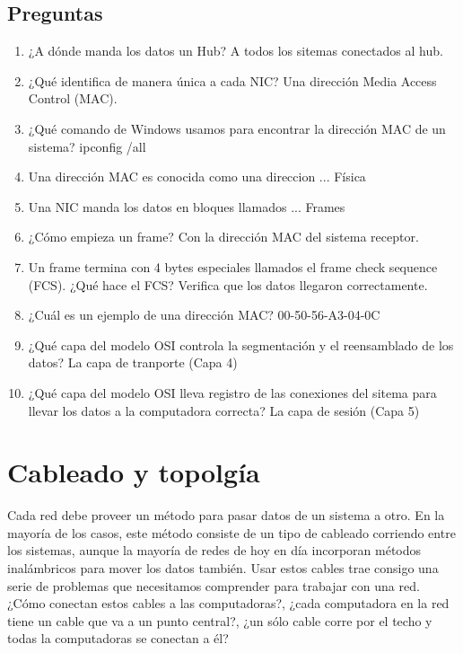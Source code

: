 \documentclass[12pt]{report}
\begin{document}
\section{Preguntas}

\begin{enumerate}
  \item ¿A dónde manda los datos un Hub?
    A todos los sitemas conectados al hub.
  \item ¿Qué identifica de manera única a cada NIC?
    Una dirección Media Access Control (MAC).
  \item ¿Qué comando de Windows usamos para encontrar la dirección MAC de un sistema?
    ipconfig /all
  \item Una dirección MAC es conocida como una direccion ...
    Física
  \item Una NIC manda los datos en bloques llamados ...
    Frames
  \item ¿Cómo empieza un frame?
   Con la dirección MAC del sistema receptor.
  \item Un frame termina con 4 bytes especiales llamados el frame check sequence (FCS). ¿Qué hace el FCS?
    Verifica que los datos llegaron correctamente.
  \item ¿Cuál es un ejemplo de una dirección MAC?
    00-50-56-A3-04-0C
  \item ¿Qué capa del modelo OSI controla la segmentación y el reensamblado de los datos?
    La capa de tranporte (Capa 4)
  \item ¿Qué capa del modelo OSI lleva registro de las conexiones del sitema para llevar los datos a la computadora correcta?
    La capa de sesión (Capa 5)
\end{enumerate}

\chapter{Cableado y topolgía}
Cada red debe proveer un método para pasar datos de un sistema a otro. En la mayoría 
de los casos, este método consiste de un tipo de cableado corriendo entre los sistemas,
aunque la mayoría de redes de hoy en día incorporan métodos inalámbricos para mover 
los datos también. Usar estos cables trae consigo una serie de problemas que necesitamos 
comprender para trabajar con una red. ¿Cómo conectan estos cables a las computadoras?,
¿cada computadora en la red tiene un cable que va a un punto central?, ¿un sólo cable
corre por el techo y todas la computadoras se conectan a él?\\
\end{document}
